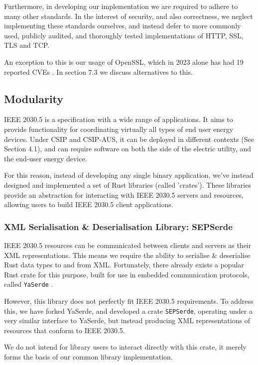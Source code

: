 Furthermore, in developing our implementation we are required to adhere to many other standards. In the interest of security, and also correctness, we neglect implementing these standards ourselves, and instead defer to more commonly used, publicly audited, and thoroughly tested implementations of HTTP, SSL, TLS and TCP. 

An exception to this is our usage of OpenSSL, which in 2023 alone has had 19 reported CVEs \cite{OpensslCVE}. In section 7.3 we discuss alternatives to this.

\subsection{Modularity}
IEEE 2030.5 is a specification with a wide range of applications. It aims to provide functionality for coordinating virtually all types of end user energy devices. Under CSIP and CSIP-AUS, it can be deployed in different contexts (See Section 4.1), and can require software on both the side of the electric utility, and the end-user energy device.

For this reason, instead of developing any single binary application, we've instead designed and implemented a set of Rust libraries (called 'crates'). These libraries provide an abstraction for interacting with IEEE 2030.5 servers and resources, allowing users to build IEEE 2030.5 client applications.

\subsubsection{XML Serialisation \& Deserialisation Library: \- SEPSerde}
IEEE 2030.5 resources can be communicated between clients and servers as their XML representations. This means we require the ability to serialise \& deserialise Rust data types to and from XML.
Fortunately, there already exists a popular Rust crate for this purpose, built for use in embedded communication protocols, called \texttt{YaSerde} \cite[]{YaSerde}.

However, this library does not perfectly fit IEEE 2030.5 requirements. To address this, we have forked YaSerde, and developed a crate \texttt{SEPSerde}, operating under a very similar interface to YaSerde, but instead producing XML representations of resources that conform to IEEE 2030.5. 

We do not intend for library users to interact directly with this crate, it merely forms the basis of our common library implementation. 

